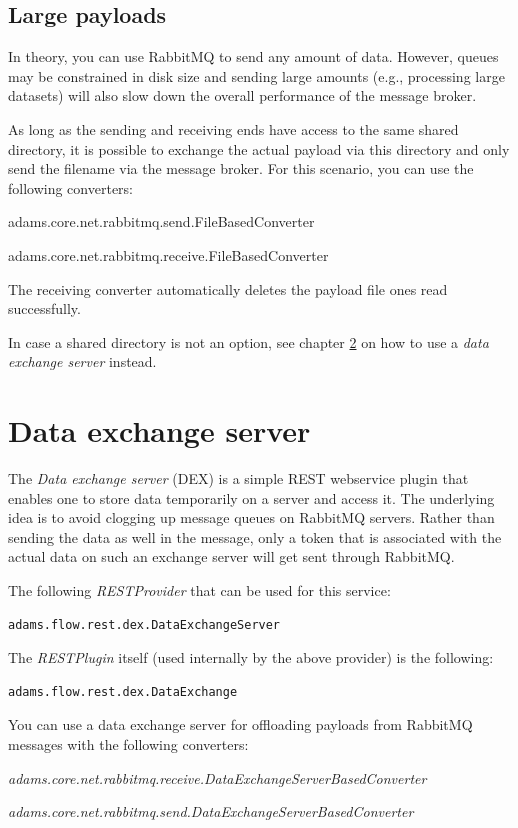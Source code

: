 \documentclass[a4paper]{book}
\begin{document}
\section{Large payloads}
In theory, you can use RabbitMQ to send any amount of data. However, queues
may be constrained in disk size and sending large amounts (e.g., processing
large datasets) will also slow down the overall performance of the message broker.

As long as the sending and receiving ends have access to the same shared directory,
it is possible to exchange the actual payload via this directory and only send
the filename via the message broker. For this scenario, you can use the following
converters:
\begin{tight_itemize}
  \item adams.core.net.rabbitmq.send.FileBasedConverter
  \item adams.core.net.rabbitmq.receive.FileBasedConverter
\end{tight_itemize}
The receiving converter automatically deletes the payload file ones read
successfully.

In case a shared directory is not an option, see chapter \ref{dex} on how to use
a \textit{data exchange server} instead.


\chapter{Data exchange server}
\label{dex}
The \textit{Data exchange server} (DEX) is a simple REST webservice plugin that enables
one to store data temporarily on a server and access it. The underlying idea is
to avoid clogging up message queues on RabbitMQ servers. Rather than sending the
data as well in the message, only a token that is associated with the actual
data on such an exchange server will get sent through RabbitMQ.

\noindent The following \textit{RESTProvider} that can be used for this service:
\begin{verbatim}
adams.flow.rest.dex.DataExchangeServer
\end{verbatim}

\noindent The \textit{RESTPlugin} itself (used internally by the above provider)
is the following:
\begin{verbatim}
adams.flow.rest.dex.DataExchange
\end{verbatim}

\noindent You can use a data exchange server for offloading payloads from
RabbitMQ messages with the following converters:
\begin{tight_itemize}
  \item \textit{adams.core.net.rabbitmq.receive.DataExchangeServerBasedConverter}
  \item \textit{adams.core.net.rabbitmq.send.DataExchangeServerBasedConverter}
\end{tight_itemize}
\end{document}
